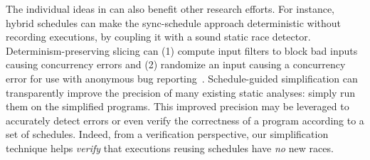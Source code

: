  The individual ideas in \peregrine
can also benefit other research efforts.  For instance, hybrid schedules
can make the sync-schedule approach deterministic without recording
executions, by coupling it with a sound static race detector.
Determinism-preserving slicing can (1) compute input filters to block bad
inputs~\cite{castro:bouncer} causing concurrency errors and (2) randomize
an input causing a concurrency error for use with anonymous bug
reporting~\cite{castro:bug-report-privacy}.  Schedule-guided
simplification can transparently improve the precision of many existing
static analyses: simply run them on the simplified programs.  This improved
precision may be leveraged to accurately detect errors or even
verify the correctness of a program according to a set of schedules.
Indeed, from a verification perspective, our simplification technique
helps \emph{verify} that executions reusing schedules have \emph{no}
new races.

